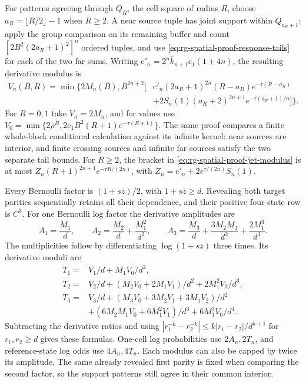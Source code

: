 For patterns agreeing through \(Q_R\), the cell square of radius \(R\),
choose \(a_R=\lfloor R/2\rfloor-1\) when \(R\ge2\). A near source tuple has
joint support within \(Q_{a_R+1}\); apply the group comparison on its
remaining buffer and count \([2B^2(2a_R+1)^2]^n\) ordered tuples, and use
\cref{eq:rg-spatial-proof-response-tails} for each of the two far sums.
Writing \(\mathrm c'_n=2^n\bar k_{n+1}\mathrm c_1(1+4n)\), the resulting derivative modulus
is
\begin{equation}
\begin{split}
 V_n(B,R)=\min\bigl\{2M_n(B),B^{2n+2}\bigl[
 &\mathrm c'_n(2a_R+1)^{2n}(R-a_R)e^{-\tau(R-a_R)}\\
 &+2S_n(1)(a_R+2)^{2n+1}e^{-\tau(a_R+1)/n}\bigr]\bigr\}.
\end{split}
 \label{eq:rg-spatial-proof-jet-modulus}
\end{equation}
For \(R=0,1\) take \(V_n=2M_n\), and for values use
\(V_0=\min\{2\rho^B,2\mathrm c_1B^2(R+1)e^{-\tau(R+1)}\}\). The same proof
compares a finite whole-block conditional calculation against its infinite
kernel: near sources are interior, and finite crossing sources and infinite
far sources satisfy the two separate tail bounds. For \(R\ge2\), the
bracket in \cref{eq:rg-spatial-proof-jet-modulus} is at most
\(Z_n(R+1)^{2n+1}e^{-\tau R/(2n)}\), with
\(Z_n=\mathrm c'_n+2e^{\tau/(2n)}S_n(1)\).

Every Bernoulli factor is \((1+s\bar z)/2\), with \(1+s\bar z\ge d\).
Revealing both target parities sequentially retains all their dependence,
and their positive four-state row is \(C^3\). For one Bernoulli log factor
the derivative amplitudes are
\begin{equation}
 A_1=\frac{M_1}{d},\qquad
 A_2=\frac{M_2}{d}+\frac{M_1^2}{d^2},\qquad
 A_3=\frac{M_3}{d}+\frac{3M_2M_1}{d^2}+\frac{2M_1^3}{d^3}.
 \label{eq:rg-spatial-proof-log-jet-amplitudes}
\end{equation}
The multiplicities follow by differentiating \(\log(1+s\bar z)\) three
times. Its derivative moduli are
\begin{equation}
 \begin{split}
 T_1={}&V_1/d+M_1V_0/d^2,\\
 T_2={}&V_2/d+(M_2V_0+2M_1V_1)/d^2+2M_1^2V_0/d^3,\\
 T_3={}&V_3/d+(M_3V_0+3M_2V_1+3M_1V_2)/d^2\\
       &+(6M_2M_1V_0+6M_1^2V_1)/d^3+6M_1^3V_0/d^4.
 \end{split}
 \label{eq:rg-spatial-proof-log-jet-moduli}
\end{equation}
Subtracting the derivative ratios and using \(|r_1^{-k}-r_2^{-k}|\le
k|r_1-r_2|/d^{k+1}\) for \(r_1,r_2\ge d\) gives these formulas. One-cell log
probabilities use \(2A_n,2T_n\), and reference-state log odds use
\(4A_n,4T_n\). Each modulus can also be capped by twice its amplitude. The
same already revealed first parity is fixed when comparing the second
factor, so the support patterns still agree in their common interior.

